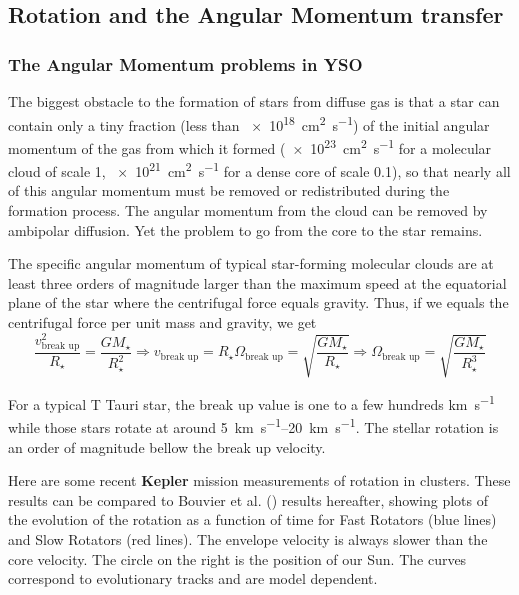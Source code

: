 \documentclass[10pt,a4paper,english]{article}
\begin{document}
\subsection{Rotation and the Angular Momentum transfer}

\subsubsection{The Angular Momentum problems in YSO}

The biggest obstacle to the formation of stars from diffuse gas is that a star
can contain only a tiny fraction (less than \SI{e18}{\square\cm\per\s}) of the
initial angular momentum of the gas from which it formed
(\SI{e23}{\square\cm\per\s} for a molecular cloud of scale \SI{1}{\pc},
\SI{e21}{\square\cm\per\s} for a dense core of scale \SI{0.1}{\pc}), so that
nearly all of this angular momentum must be removed or redistributed during the
formation process. The angular momentum from the cloud can be removed by
ambipolar diffusion. Yet the problem to go from the core to the star remains.

The specific angular momentum of typical star-forming molecular clouds are at
least three orders of magnitude larger than the maximum speed at the equatorial
plane of the star where the centrifugal force equals gravity. Thus, if we
equals the centrifugal force per unit mass and gravity, we get
\begin{equation}
    \frac{v^2_\textrm{break up}}{R_\star} = \frac{GM_\star}{R_\star^2}
    \Rightarrow v_\textrm{break up} = R_\star \Omega_\textrm{break up} = \sqrt{\frac{GM_\star}{R_\star}}
    \Rightarrow \Omega_\textrm{break up} = \sqrt{\frac{GM_\star}{R_\star^3}}
\end{equation}

For a typical T Tauri star, the break up value is one to a few hundreds
\si{\km\per\s} while those stars rotate at around \SIrange{5}{20}{\km\per\s}.
The stellar rotation is an order of magnitude bellow the break up velocity.

Here are some recent \textbf{Kepler} mission measurements of rotation in
clusters.   These results can be compared to Bouvier et
al. () results hereafter, showing plots of the
evolution of the rotation as a function of time for Fast Rotators (blue lines)
and Slow Rotators (red lines). The envelope velocity is always slower than the
core velocity. The circle on the right is the position of our Sun. The curves
correspond to evolutionary tracks and are model dependent.
\end{document}
